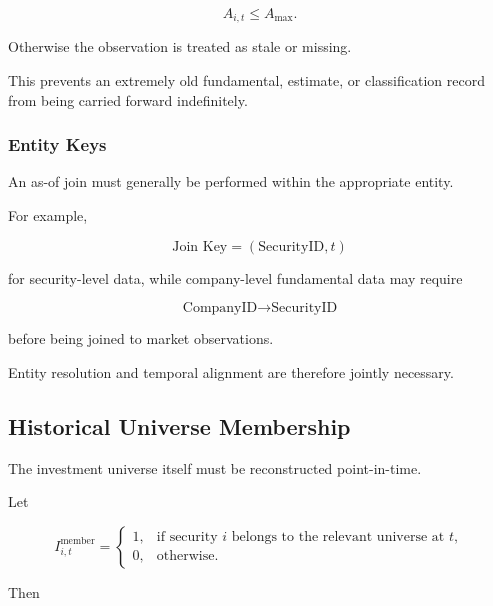 \documentclass[11pt,a4paper]{article}
\begin{document}
\begin{equation}
\boxed{
A_{i,t}
\leq
A_{\max}.
}
\end{equation}

Otherwise the observation is treated as stale or missing.

This prevents an extremely old fundamental, estimate, or classification record
from being carried forward indefinitely.


\subsubsection{Entity Keys}

An as-of join must generally be performed within the appropriate entity.

For example,

\begin{equation}
\boxed{
\text{Join Key}
=
(\mathrm{SecurityID},t)
}
\end{equation}

for security-level data, while company-level fundamental data may require

\begin{equation}
\boxed{
\text{CompanyID}
\longrightarrow
\text{SecurityID}
}
\end{equation}

before being joined to market observations.

Entity resolution and temporal alignment are therefore jointly necessary.


\subsection{Historical Universe Membership}
\label{subsec:historical_universe_membership}

The investment universe itself must be reconstructed point-in-time.

Let

\begin{equation}
I_{i,t}^{\mathrm{member}}
=
\begin{cases}
1,
&
\text{if security }i
\text{ belongs to the relevant universe at }t,
\\
0,
&
\text{otherwise}.
\end{cases}
\end{equation}

Then
\end{document}

